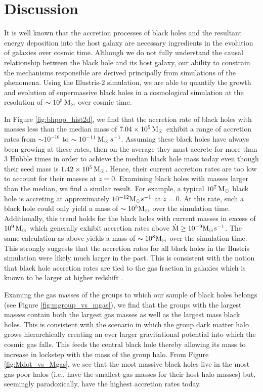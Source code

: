 \section{Discussion}

\label{sec:discussion}It is well known that the accretion processes
of black holes and the resultant energy deposition into the host galaxy
are necessary ingredients in the evolution of galaxies over cosmic
time. Although we do not fully understand the causal relationship
between the black hole and its host galaxy, our ability to constrain
the mechanisms responsible are derived principally from simulations
of the phenomena. Using the Illustris-2 simulation, we are able to
quantify the growth and evolution of supermassive black holes in a
cosmological simulation at the resolution of $\sim10^{5}\,{\rm M_{\odot}}$
over cosmic time.

In Figure \ref{fig:bhpop_hist2d}, we find that the accretion rate
of black holes with masses less than the median mass of $7.04\times10^{5}\,{\rm M}_{\odot}$
exhibit a range of accretion rates from $\sim10^{-16}$ to $\sim10^{-11}\,{\rm M_{\odot}}\, s^{-1}$.
Assuming these black holes have always been growing at these rates,
then on the average they must accrete for more than $3$ Hubble times
in order to achieve the median black hole mass today even though their
seed mass is $1.42\times10^{5}\,{\rm M_{\odot}}$. Hence, their current
accretion rates are too low to account for their masses at $z=0$.
Examining black holes with masses larger than the median, we find
a similar result. For example, a typical $10^{7}\,{\rm M}_{\odot}$
black hole is accreting at approximately $10^{-12}{\rm M}_{\odot}s^{-1}$
at $z=0$. At this rate, such a black hole could only yield a mass
of $\sim10^{5}{\rm M}_{\odot}$ over the simulation time. Additionally,
this trend holds for the black holes with current masses in excess
of $10^{9}\,{\rm M_{\odot}}$ which generally exhibit accretion rates
above $\dot{{\rm M}}\ge10^{-9}{\rm M}_{\odot}s^{-1}$. The same calculation
as above yields a mass of $\sim10^{8}{\rm M}_{\odot}$ over the simulation
time. This strongly suggests that the accretion rates for all black
holes in the Ilustris simulation were likely much larger in the past.
This is consistent with the notion that black hole accretion rates
are tied to the gas fraction in galaxies which is known to be larger
at higher redshift \citep{bauermeister2013theegnog}.

Examing the gas masses of the groups to which our sample of black
holes belongs (see Figure \ref{fig:mgroup_vs_mgas}), we find that
the groups with the largest masses contain both the largest gas masses
as well as the largest mass black holes. This is consistent with the
scenario in which the group dark matter halo grows hierarchically
creating an ever larger gravitational potential into which the cosmic
gas falls. This feeds the central black hole thereby allowing its
mass to increase in lockstep with the mass of the group halo. From
Figure \ref{fig:Mdot_vs_Mgas}, we see that the most massive black
holes live in the most gas poor halos (i.e., have the smallest gas
masses for their host halo masses) but, seemingly paradoxically, have
the highest accretion rates today.

